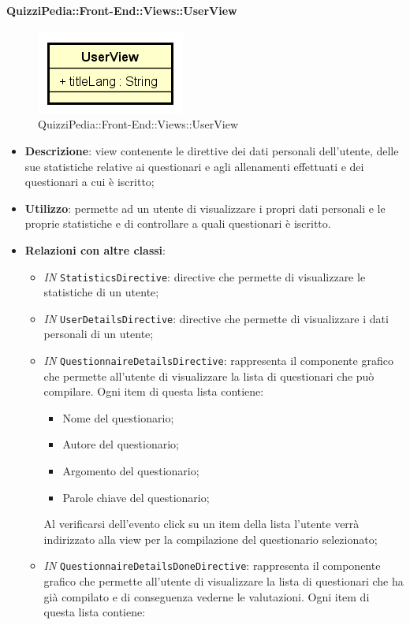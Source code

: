 \paragraph{QuizziPedia::Front-End::Views::UserView}
\begin{figure} [ht]
	\centering
	\includegraphics[scale=0.80]{UML/Classi/Front-End/QuizziPedia_Front-end_Views_UserView.png}
	\caption{QuizziPedia::Front-End::Views::UserView}
\end{figure} \FloatBarrier
\begin{itemize}
	\item \textbf{Descrizione}: view contenente le direttive dei dati personali dell'utente, delle sue statistiche relative ai questionari e agli allenamenti effettuati e dei questionari a cui è iscritto;
	\item \textbf{Utilizzo}:  permette ad un utente di visualizzare i propri dati personali e le proprie statistiche e di controllare a quali questionari è iscritto. 
	\item \textbf{Relazioni con altre classi}:
	\begin{itemize}
		\item \textit{IN} \texttt{StatisticsDirective}: directive che permette di visualizzare le statistiche di un utente;
		\item \textit{IN} \texttt{UserDetailsDirective}: directive che permette di visualizzare i dati personali di un utente;
		\item \textit{IN} \texttt{QuestionnaireDetailsDirective}: rappresenta il componente grafico che permette all'utente di visualizzare la lista di questionari che può compilare. Ogni item di questa lista contiene:
		\begin{itemize}
			\item Nome del questionario;
			\item Autore del questionario;
			\item Argomento del questionario;
			\item Parole chiave del questionario;
		\end{itemize}
		Al verificarsi dell'evento click su un item della lista l'utente verrà indirizzato alla view per la compilazione del questionario selezionato;
		\item \textit{IN} \texttt{QuestionnaireDetailsDoneDirective}: rappresenta il componente grafico che permette all'utente di visualizzare la lista di questionari che ha già compilato e di conseguenza vederne le valutazioni. Ogni item di questa lista contiene:

\end{itemize}
\end{itemize}

